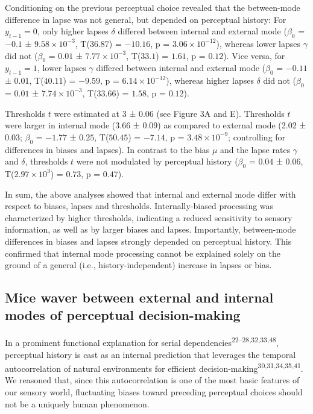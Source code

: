\documentclass[
]{article}
\begin{document}
Conditioning on the previous perceptual choice revealed that the
between-mode difference in lapse was not general, but depended on
perceptual history: For \(y_{t-1} = 0\), only higher lapses \(\delta\)
differed between internal and external mode (\(\beta_0\) = \(-0.1\) ±
\(\ensuremath{9.58\times 10^{-3}}\), T(\(36.87\)) = \(-10.16\), p =
\(\ensuremath{3.06\times 10^{-12}}\)), whereas lower lapses \(\gamma\)
did not (\(\beta_0\) = \(0.01\) ± \(\ensuremath{7.77\times 10^{-3}}\),
T(\(33.1\)) = \(1.61\), p = \(0.12\)). Vice versa, for \(y_{t-1} = 1\),
lower lapses \(\gamma\) differed between internal and external mode
(\(\beta_0\) = \(-0.11\) ± \(0.01\), T(\(40.11\)) = \(-9.59\), p =
\(\ensuremath{6.14\times 10^{-12}}\)), whereas higher lapses \(\delta\)
did not (\(\beta_0\) = \(0.01\) ± \(\ensuremath{7.74\times 10^{-3}}\),
T(\(33.66\)) = \(1.58\), p = \(0.12\)).

Thresholds \(t\) were estimated at 3 ± 0.06 (see Figure 3A and E).
Thresholds \(t\) were larger in internal mode (3.66 ± 0.09) as compared
to external mode (2.02 ± 0.03; \(\beta_0\) = \(-1.77\) ± \(0.25\),
T(\(50.45\)) = \(-7.14\), p = \(\ensuremath{3.48\times 10^{-9}}\);
controlling for differences in biases and lapses). In contrast to the
bias \(\mu\) and the lapse rates \(\gamma\) and \(\delta\), thresholds
\(t\) were not modulated by perceptual history (\(\beta_0\) = \(0.04\) ±
\(0.06\), T(\(\ensuremath{2.97\times 10^{3}}\)) = \(0.73\), p =
\(0.47\)).

In sum, the above analyses showed that internal and external mode differ
with respect to biases, lapses and thresholds. Internally-biased
processing was characterized by higher thresholds, indicating a reduced
sensitivity to sensory information, as well as by larger biases and
lapses. Importantly, between-mode differences in biases and lapses
strongly depended on perceptual history. This confirmed that internal
mode processing cannot be explained solely on the ground of a general
(i.e., history-independent) increase in lapses or bias.

\hypertarget{mice-waver-between-external-and-internal-modes-of-perceptual-decision-making}{%
\subsection{Mice waver between external and internal modes of perceptual
decision-making}\label{mice-waver-between-external-and-internal-modes-of-perceptual-decision-making}}

In a prominent functional explanation for serial
dependencies\textsuperscript{22--28,32,33,48}, perceptual history is
cast as an internal prediction that leverages the temporal
autocorrelation of natural environments for efficient
decision-making\textsuperscript{30,31,34,35,41}. We reasoned that, since
this autocorrelation is one of the most basic features of our sensory
world, fluctuating biases toward preceding perceptual choices should not
be a uniquely human phenomenon.
\end{document}
